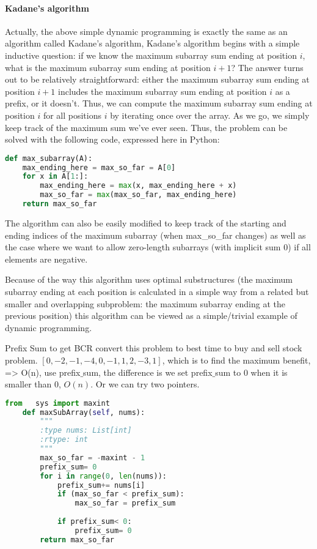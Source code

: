 \documentclass[../main.tex]{subfiles}
\begin{document}
\paragraph{Kadane's algorithm}
Actually, the above simple dynamic programming is exactly the same as an algorithm called Kadane's algorithm,  Kadane's algorithm begins with a simple inductive question: if we know the maximum subarray sum ending at position $i$, what is the maximum subarray sum ending at position $i+1$? The answer turns out to be relatively straightforward: either the maximum subarray sum ending at position $i+1$ includes the maximum subarray sum ending at position $i$ as a prefix, or it doesn't. Thus, we can compute the maximum subarray sum ending at position $i$ for all positions $i$ by iterating once over the array. As we go, we simply keep track of the maximum sum we've ever seen. Thus, the problem can be solved with the following code, expressed here in Python:
\begin{lstlisting}[language = Python]
def max_subarray(A):
    max_ending_here = max_so_far = A[0]
    for x in A[1:]:
        max_ending_here = max(x, max_ending_here + x)
        max_so_far = max(max_so_far, max_ending_here)
    return max_so_far
\end{lstlisting}

The algorithm can also be easily modified to keep track of the starting and ending indices of the maximum subarray (when max\_so\_far changes) as well as the case where we want to allow zero-length subarrays (with implicit sum 0) if all elements are negative.

Because of the way this algorithm uses optimal substructures (the maximum subarray ending at each position is calculated in a simple way from a related but smaller and overlapping subproblem: the maximum subarray ending at the previous position) this algorithm can be viewed as a simple/trivial example of dynamic programming.


{Prefix Sum} to get BCR
convert this problem to best time to buy and sell stock problem. $[0, -2, -1, -4, 0, -1, 1, 2, -3, 1]$, which is to find the maximum benefit, => O(n), use prefix$\_$sum, the difference is we set prefix$\_$sum to 0 when it is smaller than 0, $O(n)$. Or we can try two pointers.
\begin{lstlisting}[language = Python]
from   sys import maxint
    def maxSubArray(self, nums):
        """
        :type nums: List[int]
        :rtype: int
        """
        max_so_far = -maxint - 1
        prefix_sum= 0
        for i in range(0, len(nums)):
            prefix_sum+= nums[i]
            if (max_so_far < prefix_sum):
                max_so_far = prefix_sum
 
            if prefix_sum< 0:
                prefix_sum= 0  
        return max_so_far
\end{lstlisting}
\end{document}
